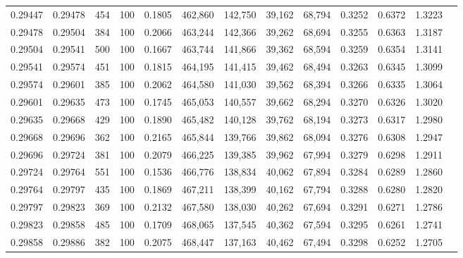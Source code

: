 \begin{tabular}{rrrrrrrrrrrrr}
0.29447 & 0.29478 &   454 & 100 &                                     0.1805 & 462,860 & 142,750 &  39,162 &  68,794 & 0.3252 & 0.6372 & 1.3223 \\
0.29478 & 0.29504 &   384 & 100 &                                     0.2066 & 463,244 & 142,366 &  39,262 &  68,694 & 0.3255 & 0.6363 & 1.3187 \\
0.29504 & 0.29541 &   500 & 100 &                                     0.1667 & 463,744 & 141,866 &  39,362 &  68,594 & 0.3259 & 0.6354 & 1.3141 \\
0.29541 & 0.29574 &   451 & 100 &                                     0.1815 & 464,195 & 141,415 &  39,462 &  68,494 & 0.3263 & 0.6345 & 1.3099 \\
0.29574 & 0.29601 &   385 & 100 &                                     0.2062 & 464,580 & 141,030 &  39,562 &  68,394 & 0.3266 & 0.6335 & 1.3064 \\
0.29601 & 0.29635 &   473 & 100 &                                     0.1745 & 465,053 & 140,557 &  39,662 &  68,294 & 0.3270 & 0.6326 & 1.3020 \\
0.29635 & 0.29668 &   429 & 100 &                                     0.1890 & 465,482 & 140,128 &  39,762 &  68,194 & 0.3273 & 0.6317 & 1.2980 \\
0.29668 & 0.29696 &   362 & 100 &                                     0.2165 & 465,844 & 139,766 &  39,862 &  68,094 & 0.3276 & 0.6308 & 1.2947 \\
0.29696 & 0.29724 &   381 & 100 &                                     0.2079 & 466,225 & 139,385 &  39,962 &  67,994 & 0.3279 & 0.6298 & 1.2911 \\
0.29724 & 0.29764 &   551 & 100 &                                     0.1536 & 466,776 & 138,834 &  40,062 &  67,894 & 0.3284 & 0.6289 & 1.2860 \\
0.29764 & 0.29797 &   435 & 100 &                                     0.1869 & 467,211 & 138,399 &  40,162 &  67,794 & 0.3288 & 0.6280 & 1.2820 \\
0.29797 & 0.29823 &   369 & 100 &                                     0.2132 & 467,580 & 138,030 &  40,262 &  67,694 & 0.3291 & 0.6271 & 1.2786 \\
0.29823 & 0.29858 &   485 & 100 &                                     0.1709 & 468,065 & 137,545 &  40,362 &  67,594 & 0.3295 & 0.6261 & 1.2741 \\
0.29858 & 0.29886 &   382 & 100 &                                     0.2075 & 468,447 & 137,163 &  40,462 &  67,494 & 0.3298 & 0.6252 & 1.2705 \\

\end{tabular}
